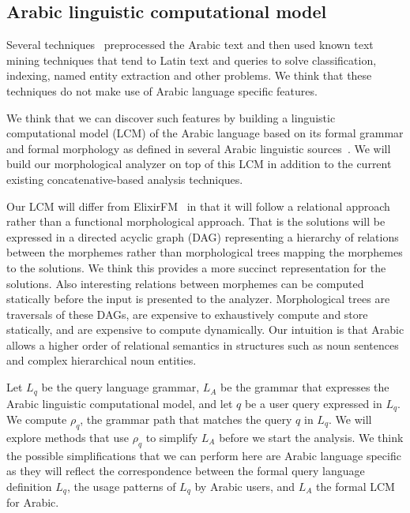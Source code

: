 \documentclass[12pt]{article}
\begin{document}
\subsection{Arabic linguistic computational model }
\label{s:design:lcm}

Several techniques~\cite{AEL07,Ham07,Abd07,MEl03} 
preprocessed the Arabic text and then used known text 
mining techniques that tend to Latin text and queries
to solve classification, indexing, named entity 
extraction and other problems.
We think that these techniques do not make use 
of Arabic language specific features.

We think that we can discover such features by building
a linguistic computational model (LCM) of the Arabic language
based on its formal grammar and formal morphology
as defined in several Arabic linguistic 
sources~\cite{Sha73,Abd00,Abd001}.
We will build our morphological analyzer on top 
of this LCM in addition to the current existing
concatenative-based analysis techniques. 

Our LCM will differ from ElixirFM~\cite{Otakar:07}
in that it will follow a relational approach rather 
than a functional morphological approach. 
That is the solutions will be expressed in a directed acyclic graph 
(DAG)
representing a hierarchy of relations between the morphemes 
rather than morphological trees mapping the morphemes to the 
solutions.
We think this provides a more succinct
representation for the solutions.
Also interesting relations 
between morphemes can be computed statically before
the input is presented to the analyzer.
Morphological trees are traversals of these DAGs, are expensive 
to exhaustively compute and store statically, 
and are expensive to compute dynamically. 
Our intuition is that Arabic allows a higher order
of relational semantics in structures
such as noun sentences and complex hierarchical noun 
entities.

Let $L_q$ be the query language grammar, 
$L_A$ be the grammar that expresses the Arabic linguistic
computational model, and let $q$ be a user query expressed
in $L_q$.
We compute $\rho_q$, the grammar path that matches 
the query $q$ in $L_q$. 
We will explore methods that use $\rho_q$ to simplify 
$L_A$ before we start the analysis. 
We think the possible simplifications that we can perform
here are Arabic language specific as they will reflect the 
correspondence between the formal query language definition $L_q$, 
the usage patterns of $L_q$  by Arabic users, 
and $L_A$ the formal LCM for Arabic. 
\end{document}
